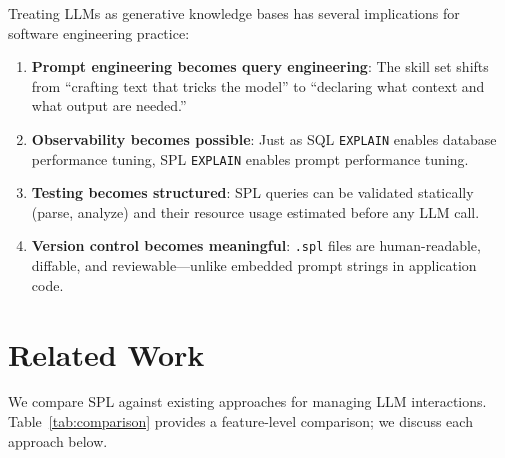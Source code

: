 \documentclass[11pt,a4paper]{article}
\begin{document}
Treating LLMs as generative knowledge bases has several implications for software engineering practice:

\begin{enumerate}[nosep]
  \item \textbf{Prompt engineering becomes query engineering}: The skill set shifts from ``crafting text that tricks the model'' to ``declaring what context and what output are needed.''
  \item \textbf{Observability becomes possible}: Just as SQL \texttt{EXPLAIN} enables database performance tuning, SPL \texttt{EXPLAIN} enables prompt performance tuning.
  \item \textbf{Testing becomes structured}: SPL queries can be validated statically (parse, analyze) and their resource usage estimated before any LLM call.
  \item \textbf{Version control becomes meaningful}: \texttt{.spl} files are human-readable, diffable, and reviewable---unlike embedded prompt strings in application code.
\end{enumerate}

\section{Related Work}
\label{sec:related}

We compare SPL against existing approaches for managing LLM interactions. Table~\ref{tab:comparison} provides a feature-level comparison; we discuss each approach below.
\end{document}
